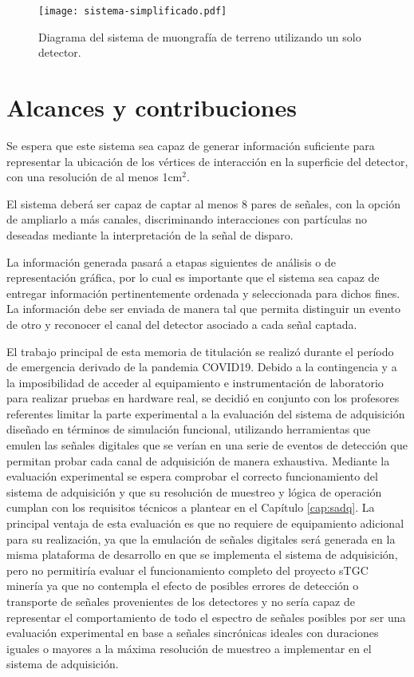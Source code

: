 	\begin{figure}[t]
		\centering
		\texttt{[image: sistema-simplificado.pdf]}
		\caption{Diagrama del sistema de muongrafía de terreno utilizando un solo detector.}
		\label{img:sistema}
	\end{figure}						

\section{Alcances y contribuciones}

	Se espera que este sistema sea capaz de generar información suficiente para representar la ubicación de los vértices de interacción en la superficie del detector, con una resolución de al menos 1cm$^2$.
	
	El sistema deberá ser capaz de captar al menos 8 pares de señales, con la opción de ampliarlo a más canales, discriminando interacciones con partículas no deseadas mediante la interpretación de la señal de disparo.
	
	La información generada pasará a etapas siguientes de análisis o de representación gráfica, por lo cual es importante que el sistema sea capaz de entregar información pertinentemente ordenada y seleccionada para dichos fines. La información debe ser enviada de manera tal que permita distinguir un evento de otro y reconocer el canal del detector asociado a cada señal captada.
	
	El trabajo principal de esta memoria de titulación se realizó durante el período de emergencia derivado de la pandemia COVID19. Debido a la contingencia y a la imposibilidad de acceder al equipamiento e instrumentación de laboratorio para realizar pruebas en hardware real, se decidió en conjunto con los profesores referentes limitar la parte experimental a la evaluación del sistema de adquisición diseñado en términos de simulación funcional, utilizando herramientas que emulen las señales digitales que se verían en una serie de eventos de detección que permitan probar cada canal de adquisición de manera exhaustiva. Mediante la evaluación experimental se espera comprobar el correcto funcionamiento del sistema de adquisición y que su resolución de muestreo y lógica de operación cumplan con los requisitos técnicos a plantear en el Capítulo \ref{cap:sadq}. La principal ventaja de esta evaluación es que no requiere de equipamiento adicional para su realización, ya que la emulación de señales digitales será generada en la misma plataforma de desarrollo en que se implementa el sistema de adquisición, pero no permitiría evaluar el funcionamiento completo del proyecto sTGC minería ya que no contempla el efecto de posibles errores de detección o transporte de señales provenientes de los detectores y no sería capaz de representar el comportamiento de todo el espectro de señales posibles por ser una evaluación experimental en base a señales sincrónicas ideales con duraciones iguales o mayores a la máxima resolución de muestreo a implementar en el sistema de adquisición.

